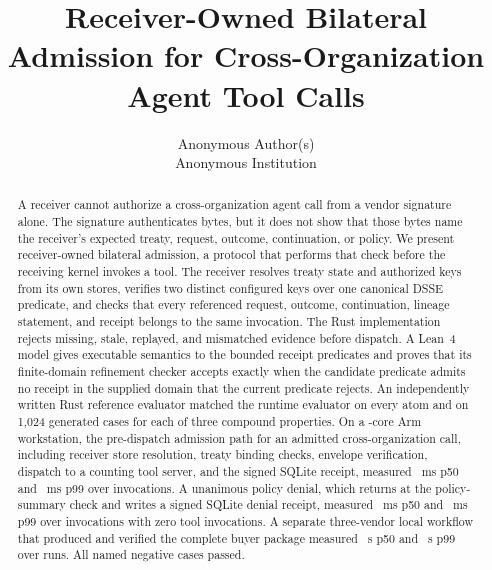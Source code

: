 \documentclass[letterpaper,twocolumn,10pt]{article}
\date{}
\title{\Large \bf Receiver-Owned Bilateral Admission for Cross-Organization Agent Tool Calls}
\author{
{\rm Anonymous Author(s)}\\
Anonymous Institution
}
\begin{document}
\maketitle

\begin{abstract}
A receiver cannot authorize a cross-organization agent call from a vendor
signature alone. The signature authenticates bytes, but it does not show that
those bytes name the receiver's expected treaty, request, outcome,
continuation, or policy. We
present receiver-owned bilateral admission, a protocol that performs that
check before the receiving kernel invokes a tool. The receiver resolves treaty
state and authorized keys from its own stores, verifies two distinct
configured keys over one canonical DSSE predicate, and checks that every
referenced request, outcome, continuation, lineage statement, and receipt
belongs to the same invocation. The Rust implementation rejects missing,
stale, replayed, and mismatched evidence before dispatch. A Lean~4 model gives
executable semantics to the bounded receipt predicates and proves that its
finite-domain refinement checker accepts exactly when the candidate predicate
admits no receipt in the supplied domain that the current predicate rejects. An
independently written Rust reference evaluator matched the runtime
evaluator on every atom and on 1,024 generated cases for each of three
compound properties. On a \PSHostCores-core Arm \PSHostCpuModel{} workstation,
the pre-dispatch admission path for an admitted cross-organization call,
including receiver store resolution, treaty binding checks, envelope
verification, dispatch to a counting tool server, and the signed SQLite
receipt, measured \PSPredispatchAllowPFiftyMs~ms p50 and
\PSPredispatchAllowPNinetyNineMs~ms p99 over
\PSPredispatchAllowSampleCount{} invocations. A unanimous policy denial, which
returns at the policy-summary check and writes a signed SQLite denial
receipt, measured \PSPredispatchDenyPFiftyMs~ms p50 and
\PSPredispatchDenyPNinetyNineMs~ms p99 over
\PSPredispatchDenySampleCount{} invocations with zero tool invocations. A
separate three-vendor local workflow that produced and verified the complete
buyer package measured \PSBuyerWorkflowPFiftySec~s p50 and
\PSBuyerWorkflowPNinetyNineSec~s p99 over \PSPathSampleCount{} runs. All
\PSThreatCaseCount{} named negative cases passed.
\end{abstract}














\end{document}
